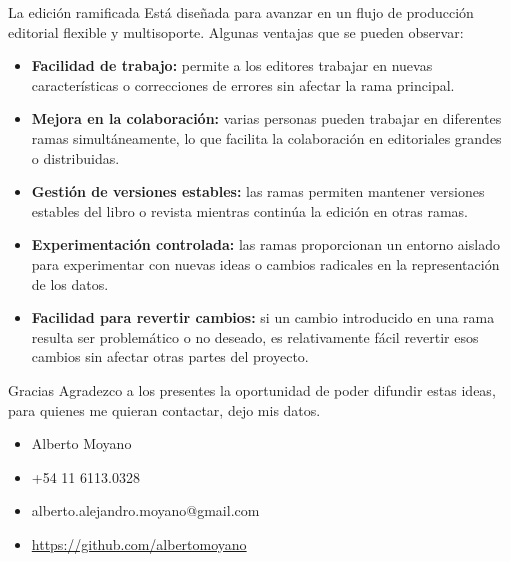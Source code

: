 \documentclass[14pt,aspectratio=169]{beamer}
\begin{document}
\begin{frame}[allowframebreaks]{La edición ramificada}
Está diseñada para avanzar en un flujo de producción editorial flexible y multisoporte. Algunas ventajas que se pueden observar:

\begin{itemize}
\item \textbf{Facilidad de trabajo:} permite a los editores trabajar en nuevas características o correcciones de errores sin afectar la rama principal.%
\item \textbf{Mejora en la colaboración:} varias personas pueden trabajar en diferentes ramas simultáneamente, lo que facilita la colaboración en editoriales grandes o distribuidas.%
\item \textbf{Gestión de versiones estables:} las ramas permiten mantener versiones estables del libro o revista mientras continúa la edición en otras ramas.
\item \textbf{Experimentación controlada:} las ramas proporcionan un entorno aislado para experimentar con nuevas ideas o cambios radicales en la representación de los datos.%
\item \textbf{Facilidad para revertir cambios:} si un cambio introducido en una rama resulta ser problemático o no deseado, es relativamente fácil revertir esos cambios sin afectar otras partes del proyecto.%
\end{itemize}
\end{frame}

\begin{frame}{Gracias}
	Agradezco a los presentes la oportunidad de poder difundir estas ideas, para quienes me quieran contactar, dejo mis datos.
\begin{itemize}
	\item Alberto Moyano
	\item +54 11 6113.0328
	\item alberto.alejandro.moyano@gmail.com
	\item \url{https://github.com/albertomoyano}
\end{itemize}
\end{frame}

\end{document}
